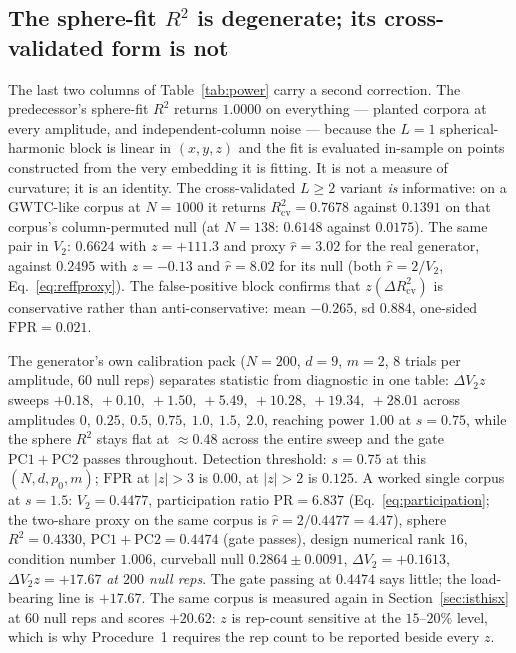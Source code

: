 \documentclass[11pt,a4paper]{article}
\theoremstyle{plain}
\theoremstyle{remark}
\theoremstyle{plain}
\begin{document}
\subsection{The sphere-fit $R^2$ is degenerate; its cross-validated form is not}

The last two columns of Table~\ref{tab:power} carry a second correction. The predecessor's sphere-fit $R^2$ returns $1.0000$ on everything --- planted corpora at every amplitude, and independent-column noise --- because the $L=1$ spherical-harmonic block is linear in $(x,y,z)$ and the fit is evaluated in-sample on points constructed from the very embedding it is fitting. It is not a measure of curvature; it is an identity. The cross-validated $L\ge2$ variant \emph{is} informative: on a GWTC-like corpus at $N=1000$ it returns $R^2_{\mathrm{cv}}=0.7678$ against $0.1391$ on that corpus's column-permuted null (at $N=138$: $0.6148$ against $0.0175$). The same pair in $V_2$: $0.6624$ with $z=+111.3$ and proxy $\hat r=3.02$ for the real generator, against $0.2495$ with $z=-0.13$ and $\hat r=8.02$ for its null (both $\hat r=2/V_2$, Eq.~\eqref{eq:reffproxy}). The false-positive block confirms that $z(\Delta R^2_{\mathrm{cv}})$ is conservative rather than anti-conservative: mean $-0.265$, sd $0.884$, one-sided $\mathrm{FPR}=0.021$.

The generator's own calibration pack ($N=200$, $d=9$, $m=2$, $8$ trials per amplitude, $60$ null reps) separates statistic from diagnostic in one table: $\Delta V_2z$ sweeps $+0.18,\ +0.10,\ +1.50,\ +5.49,\ +10.28,\ +19.34,\ +28.01$ across amplitudes $0,\ 0.25,\ 0.5,\ 0.75,\ 1.0,\ 1.5,\ 2.0$, reaching power $1.00$ at $s=0.75$, while the sphere $R^2$ stays flat at $\approx0.48$ across the entire sweep and the gate $\mathrm{PC1}+\mathrm{PC2}$ passes throughout. Detection threshold: $s=0.75$ at this $(N,d,p_0,m)$; $\mathrm{FPR}$ at $|z|>3$ is $0.00$, at $|z|>2$ is $0.125$. A worked single corpus at $s=1.5$: $V_2=0.4477$, participation ratio $\mathrm{PR}=6.837$ (Eq.~\eqref{eq:participation}; the two-share proxy on the same corpus is $\hat r=2/0.4477=4.47$), sphere $R^2=0.4330$, $\mathrm{PC1}+\mathrm{PC2}=0.4474$ (gate passes), design numerical rank $16$, condition number $1.006$, curveball null $0.2864\pm0.0091$, $\Delta V_2=+0.1613$, $\Delta V_2z=+17.67$ \emph{at $200$ null reps}. The gate passing at $0.4474$ says little; the load-bearing line is $+17.67$. The same corpus is measured again in Section~\ref{sec:isthisx} at $60$ null reps and scores $+20.62$: $z$ is rep-count sensitive at the $15$--$20\%$ level, which is why Procedure~1 requires the rep count to be reported beside every $z$.
\end{document}
